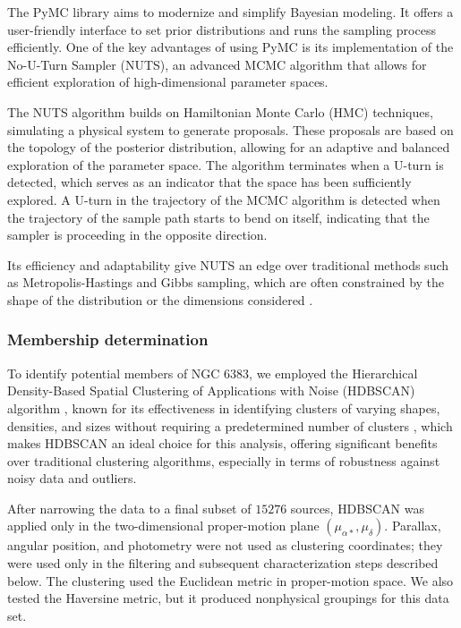 \documentclass{aa}
\begin{document}
The PyMC library aims to modernize and simplify Bayesian modeling. It offers a user-friendly interface to set prior distributions and runs the sampling process efficiently. One of the key advantages of using PyMC is its implementation of the No-U-Turn Sampler (NUTS), an advanced MCMC algorithm that allows for efficient exploration of high-dimensional parameter spaces.

The NUTS algorithm builds on Hamiltonian Monte Carlo (HMC) techniques, simulating a physical system to generate proposals. These proposals are based on the topology of the posterior distribution, allowing for an adaptive and balanced exploration of the parameter space. The algorithm terminates when a U-turn is detected, which serves as an indicator that the space has been sufficiently explored. A U-turn in the trajectory of the MCMC algorithm is detected when the trajectory of the sample path starts to bend on itself, indicating that the sampler is proceeding in the opposite direction.

Its efficiency and adaptability give NUTS an edge over traditional methods such as Metropolis-Hastings and Gibbs sampling, which are often constrained by the shape of the distribution or the dimensions considered \citep{phan2019composable}.

\subsubsection{Membership determination}\label{subsubsec:membership}

To identify potential members of NGC 6383, we employed the Hierarchical Density-Based Spatial Clustering of Applications with Noise (\textsc{HDBSCAN}) algorithm \citep{10.1007/978-3-642-37456-2_14,McInnes2017}, known for its effectiveness in identifying clusters of varying shapes, densities, and sizes without requiring a predetermined number of clusters \citep{2021A&A...646A.104H}, which makes \textsc{HDBSCAN} an ideal choice for this analysis, offering significant benefits over traditional clustering algorithms, especially in terms of robustness against noisy data and outliers.

After narrowing the data to a final subset of $15276$ sources, \textsc{HDBSCAN} was applied only in the two-dimensional proper-motion plane $(\mu_{\alpha*},\mu_\delta)$. Parallax, angular position, and photometry were not used as clustering coordinates; they were used only in the filtering and subsequent characterization steps described below. The clustering used the Euclidean metric in proper-motion space. We also tested the Haversine metric, but it produced nonphysical groupings for this data set.
\end{document}
